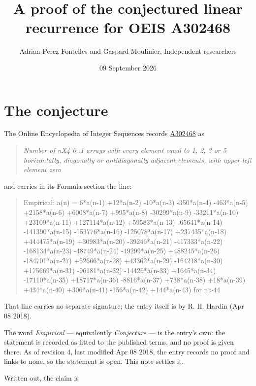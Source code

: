 \documentclass[11pt]{article}
\title{A proof of the conjectured linear recurrence for OEIS A302468}
\author{Adrian Perez Fontelles and Gaspard Moulinier, Independent researchers}
\date{09 September 2026}
\theoremstyle{definition}
\begin{document}
\maketitle
\section{The conjecture}

The Online Encyclopedia of Integer Sequences records \href{https://oeis.org/A302468}{A302468} as

\begin{quote}\itshape Number of nX4 0..1 arrays with every element equal to 1, 2, 3 or 5 horizontally, diagonally or antidiagonally adjacent elements, with upper left element zero\end{quote}

and carries in its Formula section the line:

\begin{quote}\ttfamily Empirical: a(n) = 6*a(n-1) +12*a(n-2) -10*a(n-3) -350*a(n-4) -463*a(n-5) +2158*a(n-6) +6008*a(n-7) +995*a(n-8) -30299*a(n-9) -33211*a(n-10) +23109*a(n-11) +127114*a(n-12) +59583*a(n-13) -65641*a(n-14) -141390*a(n-15) -153776*a(n-16) -125078*a(n-17) +237435*a(n-18) +444475*a(n-19) +30983*a(n-20) -39246*a(n-21) -417333*a(n-22) -168134*a(n-23) -48749*a(n-24) -49299*a(n-25) +488245*a(n-26) -184701*a(n-27) +52666*a(n-28) +43362*a(n-29) -164218*a(n-30) +175669*a(n-31) -96181*a(n-32) -14426*a(n-33) +1645*a(n-34) -17110*a(n-35) +18717*a(n-36) -8816*a(n-37) +738*a(n-38) +18*a(n-39) +434*a(n-40) +306*a(n-41) -156*a(n-42) +144*a(n-43) for n>44\end{quote}

That line carries no separate signature; the entry itself is by R. H. Hardin (Apr 08 2018).

The word {\itshape Empirical} --- equivalently {\itshape Conjecture} --- is the entry's own: the statement is recorded as fitted to the published terms, and no proof is given there. As of revision 4, last modified Apr 08 2018, the entry records no proof and links to none, so the statement is open. This note settles it.

Written out, the claim is
\end{document}

